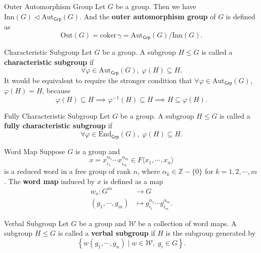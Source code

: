 \begin{definition}{Outer Automorphism Group}{}
    Let $G$ be a group. Then we have $\mathrm{Inn}(G) \lhd \mathrm{Aut}_{\mathsf{Grp}}(G)$. And the \textbf{outer automorphism group} of $G$ is defined as
    $$
        \mathrm{Out}(G)=\mathrm{coker}\,\gamma=\mathrm{Aut}_{\mathsf{Grp}}(G)/\mathrm{Inn}(G).
    $$
\end{definition}

\begin{definition}{Characteristic Subgroup}{}
    Let $G$ be a group. A subgroup $H\le G$ is called a \textbf{characteristic subgroup} if
    \[
        \forall \varphi \in\mathrm{Aut}_{\mathsf{Grp}}(G),\; \varphi(H)\subseteq H.
    \]
    It would be equivalent to require the stronger condition that $\forall \varphi \in\mathrm{Aut}_{\mathsf{Grp}}(G)$, $\varphi(H)= H$, because
    \[
        \varphi(H)\subseteq H\implies \varphi^{-1}(H)\subseteq H\implies H\subseteq \varphi(H).
    \]
\end{definition}

\begin{definition}{Fully Characteristic Subgroup}{}
    Let $G$ be a group. A subgroup $H\le G$ is called a \textbf{fully characteristic subgroup} if
    \[
        \forall \varphi \in\mathrm{End}_{\mathsf{Grp}}(G),\; \varphi(H)\subseteq H.
    \]
\end{definition}

\begin{definition}{Word Map}{}
    Suppose $G$ is a group and
    $$
        x=x_{i_1}^{\alpha_{1}}\cdots x_{i_m}^{\alpha_{m}}\in F\langle x_1,\cdots,x_n\rangle
    $$
    is a reduced word in a free group of rank $n$, where $\alpha_k\in\mathbb{Z}-\{0\}$ for $k=1,2,\cdots,m$. The \textbf{word map} induced by $x$ is defined as a map
    \begin{align*}
        w_x:G^m          & \longrightarrow G                                        \\
        (g_1,\cdots,g_m) & \longmapsto g_{i_1}^{\alpha_1}\cdots g_{i_m}^{\alpha_m}.
    \end{align*}
\end{definition}

\begin{definition}{Verbal Subgroup}{}
    Let $G$ be a group and $\mathcal{W}$ be a collection of word maps. A subgroup $H\le G$ is called a \textbf{verbal subgroup} if $H$ is the subgroup generated by
    $$
        \left\{ w(g_1,\cdots,g_n)\mid w\in\mathcal{W},\; g_i\in G \right\}.
    $$
\end{definition}

